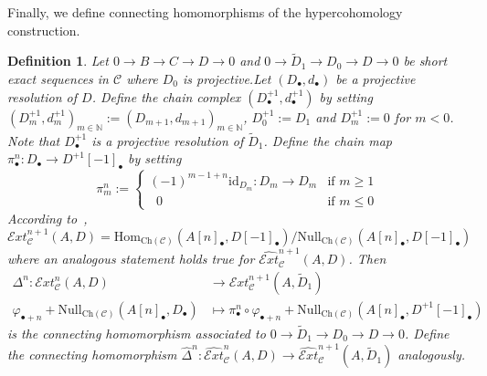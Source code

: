 \documentclass[12pt,a4paper]{article}
\numberwithin{equation}{section}
\newtheorem{defn}[thm]{Definition}
\theoremstyle{nonumberplain}
\begin{document}
Finally, we define connecting homomorphisms of the hypercohomology construction.

\begin{defn}\label{defn:hyperconnmorph}
Let $0 \rightarrow B \rightarrow C \rightarrow D \rightarrow 0$ and $0 \rightarrow \widetilde{D}_1 \rightarrow D_0 \rightarrow D \rightarrow 0$ be short exact sequences in $\mathcal{C}$ where $D_0$ is projective.Let $(D_{\bullet}, d_{\bullet})$ be a projective resolution of $D$. Define the chain complex $(D_{\bullet}^{+1}, d_{\bullet}^{+1})$ by setting $(D_m^{+1}, d_m^{+1})_{m \in \mathbb{N}} := (D_{m+1}, d_{m+1})_{m \in \mathbb{N}}$, $D_0^{+1} := D_1$ and $D_m^{+1} := 0$ for $m < 0$. \\

Note that $D_{\bullet}^{+1}$ is a projective resolution of $\widetilde{D}_1$. Define the chain map $\pi_{\bullet}^n: D_{\bullet} \rightarrow D^{+1}[-1]_{\bullet}$ by setting
\begin{equation}
\pi_m^n := \begin{cases} (-1)^{m-1+n}\mathrm{id}_{D_m}: D_m \rightarrow D_m &\text{if } m \geq 1 \\ {} \; \; 0 &\text{if } m \leq 0 \end{cases}
\end{equation}
According to~\cite[p.~166]{gel03},
\[ \mathcal{E}xt_{\mathcal{C}}^{n+1}(A, D) = \mathrm{Hom}_{\mathrm{Ch}(\mathcal{C})}(A[n]_{\bullet}, D[-1]_{\bullet})/ \mathrm{Null}_{\mathrm{Ch}(\mathcal{C})}(A[n]_{\bullet}, D[-1]_{\bullet}) \]
where an analogous statement holds true for $\widehat{\mathcal{E}xt}_{\mathcal{C}}^{n+1}(A, D)$. Then
\begin{align*}
\Delta^n: \mathcal{E}xt_{\mathcal{C}}^n(A, D) &\rightarrow \mathcal{E}xt_{\mathcal{C}}^{n+1}(A, \widetilde{D}_1) \\
\varphi_{\bullet+n}+\mathrm{Null}_{\mathrm{Ch}(\mathcal{C})}(A[n]_{\bullet}, D_{\bullet}) &\mapsto \pi_{\bullet}^n \circ \varphi_{\bullet+n}+\mathrm{Null}_{\mathrm{Ch}(\mathcal{C})}(A[n]_{\bullet}, D^{+1}[-1]_{\bullet})
\end{align*}
is the connecting homomorphism associated to $0 \rightarrow \widetilde{D}_1 \rightarrow D_0 \rightarrow D \rightarrow 0$. Define the connecting homomorphism $\widehat{\Delta}^n: \widehat{\mathcal{E}xt}_{\mathcal{C}}^n(A, D) \rightarrow \widehat{\mathcal{E}xt}_{\mathcal{C}}^{n+1}(A, \widetilde{D}_1)$ analogously. \\


\end{defn}
\end{document}
